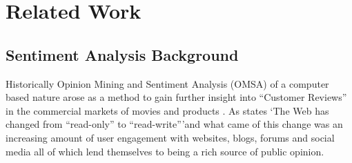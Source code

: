 \documentclass[11pt]{report}
\begin{document}
\chapter{Related Work}
\label{chap:related-work}

\section{Sentiment Analysis Background}
Historically Opinion Mining and Sentiment Analysis (OMSA) of a computer based nature arose as a method to gain further insight into ``Customer Reviews'' in the commercial markets of movies \citep{turney_thumbs_2002, hu_mining_2004} and products \citep{morinaga_mining_2002, popescu_extracting_2005}.  As \cite{cambria_new_2013} states \lq{The Web has changed from ``read-only'' to ``read-write''}\rq and what came of this change was an increasing amount of user engagement with websites, blogs, forums and social media all of which lend themselves to being a rich source of public opinion. 
\end{document}
